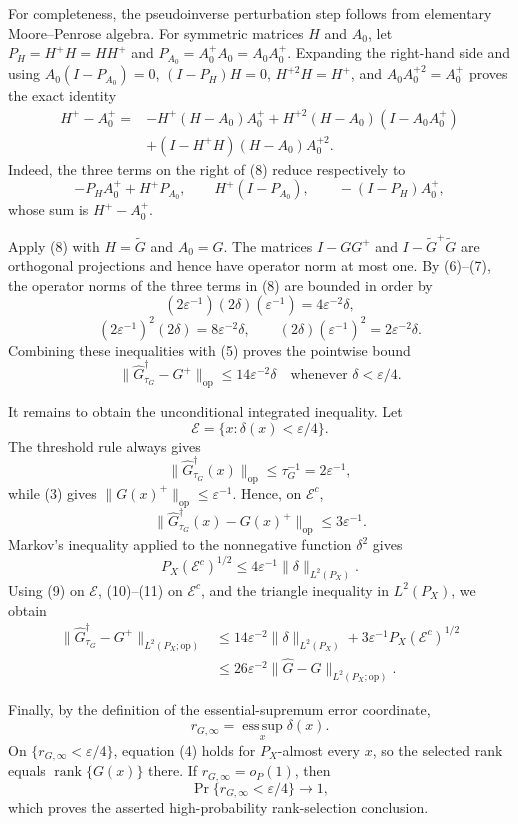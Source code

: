 For completeness, the pseudoinverse perturbation step follows from elementary Moore--Penrose algebra.  For symmetric matrices \(H\) and \(A_0\), let \(P_H=H^+H=HH^+\) and \(P_{A_0}=A_0^+A_0=A_0A_0^+\).  Expanding the right-hand side and using \(A_0(I-P_{A_0})=0\), \((I-P_H)H=0\), \(H^{+2}H=H^+\), and \(A_0A_0^{+2}=A_0^+\) proves the exact identity
\[
\begin{aligned}
 H^+-A_0^+
 ={}&-H^+(H-A_0)A_0^+
     +H^{+2}(H-A_0)(I-A_0A_0^+)\\
    &+(I-H^+H)(H-A_0)A_0^{+2}. \tag{8}
\end{aligned}
\]
Indeed, the three terms on the right of (8) reduce respectively to
\[
 -P_HA_0^+ + H^+P_{A_0},
 \qquad
 H^+(I-P_{A_0}),
 \qquad
 -(I-P_H)A_0^+,
\]
whose sum is \(H^+-A_0^+\).

Apply (8) with \(H=\widetilde G\) and \(A_0=G\).  The matrices \(I-GG^+\) and \(I-\widetilde G^+\widetilde G\) are orthogonal projections and hence have operator norm at most one.  By (6)--(7), the operator norms of the three terms in (8) are bounded in order by
\[
 (2\varepsilon^{-1})(2\delta)(\varepsilon^{-1})
     =4\varepsilon^{-2}\delta,
\]
\[
 (2\varepsilon^{-1})^2(2\delta)
     =8\varepsilon^{-2}\delta,
 \qquad
 (2\delta)(\varepsilon^{-1})^2
     =2\varepsilon^{-2}\delta.
\]
Combining these inequalities with (5) proves the pointwise bound
\[
 \|\widehat G_{\tau_G}^{\dagger}-G^+\|_{\mathrm{op}}
 \leq14\varepsilon^{-2}\delta
 \quad\text{whenever }\delta<\varepsilon/4. \tag{9}
\]

It remains to obtain the unconditional integrated inequality.  Let
\[
 \mathcal E=\{x:\delta(x)<\varepsilon/4\}.
\]
The threshold rule always gives
\[
 \|\widehat G_{\tau_G}^{\dagger}(x)\|_{\mathrm{op}}
 \leq\tau_G^{-1}=2\varepsilon^{-1},
\]
while (3) gives \(\|G(x)^+\|_{\mathrm{op}}\leq\varepsilon^{-1}\).  Hence, on \(\mathcal E^c\),
\[
 \|\widehat G_{\tau_G}^{\dagger}(x)-G(x)^+\|_{\mathrm{op}}
 \leq3\varepsilon^{-1}. \tag{10}
\]
Markov's inequality applied to the nonnegative function \(\delta^2\) gives
\[
 P_X(\mathcal E^c)^{1/2}
 \leq4\varepsilon^{-1}
       \|\delta\|_{L^2(P_X)}. \tag{11}
\]
Using (9) on \(\mathcal E\), (10)--(11) on \(\mathcal E^c\), and the triangle inequality in \(L^2(P_X)\), we obtain
\[
\begin{aligned}
 \|\widehat G_{\tau_G}^{\dagger}-G^+\|_{L^2(P_X;\mathrm{op})}
 &\leq14\varepsilon^{-2}\|\delta\|_{L^2(P_X)}
     +3\varepsilon^{-1}P_X(\mathcal E^c)^{1/2}\\
 &\leq26\varepsilon^{-2}
       \|\widehat G-G\|_{L^2(P_X;\mathrm{op})}. \tag{12}
\end{aligned}
\]

Finally, by the definition of the essential-supremum error coordinate,
\[
 r_{G,\infty}=\operatorname*{ess\,sup}_{x}\delta(x).
\]
On \(\{r_{G,\infty}<\varepsilon/4\}\), equation (4) holds for \(P_X\)-almost every \(x\), so the selected rank equals \(\operatorname{rank}\{G(x)\}\) there.  If \(r_{G,\infty}=o_P(1)\), then
\[
 \Pr\{r_{G,\infty}<\varepsilon/4\}\longrightarrow1,
\]
which proves the asserted high-probability rank-selection conclusion.
